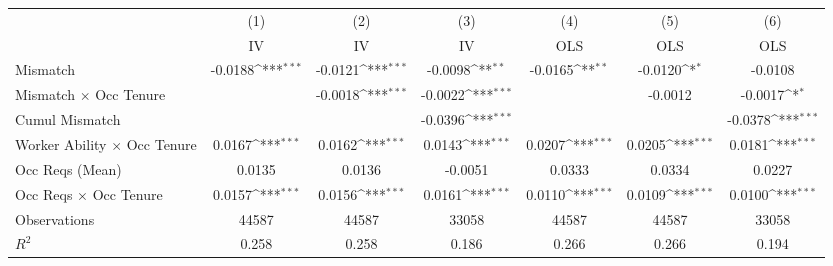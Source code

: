 {
\def\sym#1{\ifmmode^{#1}\else\(^{#1}\)\fi}
\begin{tabular}{l*{6}{c}}
\hline  
                    &\multicolumn{1}{c}{(1)}&\multicolumn{1}{c}{(2)}&\multicolumn{1}{c}{(3)}&\multicolumn{1}{c}{(4)}&\multicolumn{1}{c}{(5)}&\multicolumn{1}{c}{(6)}\\
                    &\multicolumn{1}{c}{IV}&\multicolumn{1}{c}{IV}&\multicolumn{1}{c}{IV}&\multicolumn{1}{c}{OLS}&\multicolumn{1}{c}{OLS}&\multicolumn{1}{c}{OLS}\\
\hline  
Mismatch            &     -0.0188\sym{***}&     -0.0121\sym{***}&     -0.0098\sym{**} &     -0.0165\sym{**} &     -0.0120\sym{*}  &     -0.0108         \\
[1em]
Mismatch $\times$ Occ Tenure&                     &     -0.0018\sym{***}&     -0.0022\sym{***}&                     &     -0.0012         &     -0.0017\sym{*}  \\
[1em]
Cumul Mismatch      &                     &                     &     -0.0396\sym{***}&                     &                     &     -0.0378\sym{***}\\
[1em]
Worker Ability $\times$ Occ Tenure&      0.0167\sym{***}&      0.0162\sym{***}&      0.0143\sym{***}&      0.0207\sym{***}&      0.0205\sym{***}&      0.0181\sym{***}\\
[1em]
Occ Reqs (Mean)     &      0.0135         &      0.0136         &     -0.0051         &      0.0333         &      0.0334         &      0.0227         \\
[1em]
Occ Reqs $\times$ Occ Tenure&      0.0157\sym{***}&      0.0156\sym{***}&      0.0161\sym{***}&      0.0110\sym{***}&      0.0109\sym{***}&      0.0100\sym{***}\\
\hline  
Observations        &       44587         &       44587         &       33058         &       44587         &       44587         &       33058         \\
\(R^{2}\)           &       0.258         &       0.258         &       0.186         &       0.266         &       0.266         &       0.194         \\
\hline  
\end{tabular}
}
